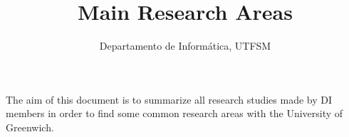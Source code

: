\documentclass[12pt,reqno]{amsart}
\title{Main Research Areas}
\author{Departamento de Inform\'atica, UTFSM}
\begin{document}
\maketitle

The aim of this document is to summarize all research studies made by DI
members in order to find some common research areas with the University of
Greenwich.












\end{document}
